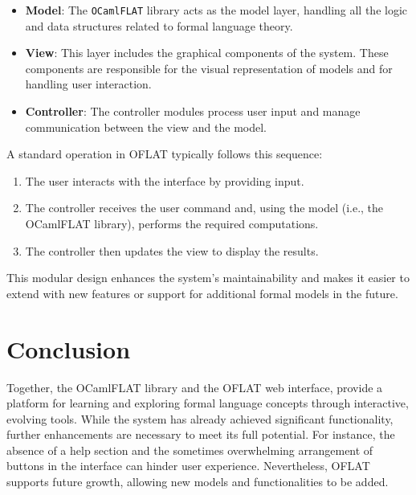 \begin{itemize}
    \item \textbf{Model}: The \texttt{OCamlFLAT} library acts as the model layer, 
    handling all the logic and data structures related to formal language theory.
    \item \textbf{View}: This layer includes the graphical components of the system.
    These components are responsible for the visual representation of models and for handling user interaction.
    \item \textbf{Controller}: The controller modules process user input and manage communication between the view and the model.
\end{itemize}
A standard operation in OFLAT typically follows this sequence:
\begin{enumerate}
    \item The user interacts with the interface by providing input.
    \item The controller receives the user command and, using the model (i.e., the OCamlFLAT library), performs the required computations.
    \item The controller then updates the view to display the results.
\end{enumerate}

This modular design enhances the system's maintainability and makes it easier to extend with new features or support for additional formal models in the future.

\section{Conclusion}

Together, the OCamlFLAT library and the OFLAT web interface, provide a platform for learning and exploring formal language concepts through interactive, evolving tools. 
While the system has already achieved significant functionality, further enhancements are necessary to meet its full potential. 
For instance, the absence of a help section and the sometimes overwhelming arrangement of buttons in the interface can hinder user experience.
Nevertheless, OFLAT supports future growth, allowing new models and functionalities to be added.

